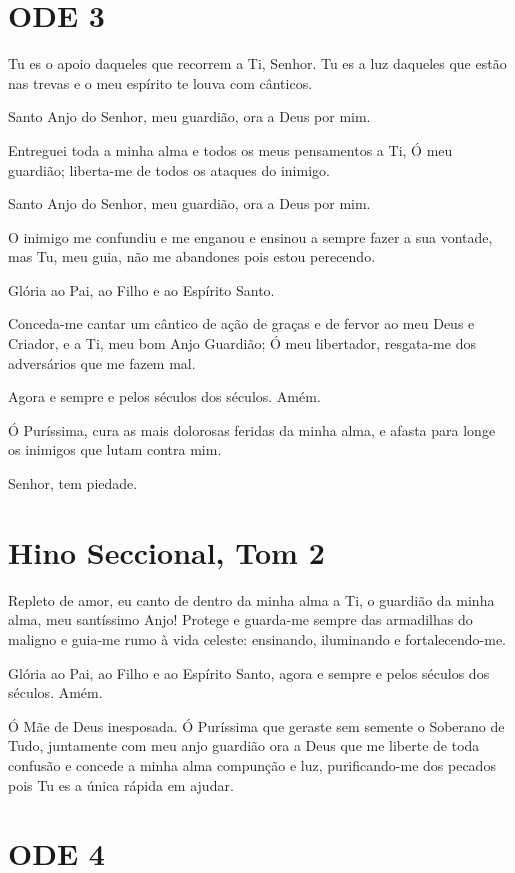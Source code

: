 \documentclass{subfiles}
\begin{document}
\section{ODE 3}

\eirmos{}Tu es o apoio daqueles que recorrem a Ti, Senhor. Tu es a luz daqueles
que estão nas trevas e o meu espírito te louva com cânticos.

Santo Anjo do Senhor, meu guardião, ora a Deus por mim.

Entreguei toda a minha alma e todos os meus pensamentos a Ti, Ó
meu guardião; liberta-me de todos os ataques do inimigo.

Santo Anjo do Senhor, meu guardião, ora a Deus por mim.

O inimigo me confundiu e me enganou e ensinou a sempre fazer a sua
vontade, mas Tu, meu guia, não me abandones pois estou perecendo.

Glória ao Pai, ao Filho e ao Espírito Santo.

Conceda-me cantar um cântico de ação de graças e de fervor ao meu
Deus e Criador, e a Ti, meu bom Anjo Guardião; Ó meu libertador, resgata-me
dos adversários que me fazem mal.

Agora e sempre e pelos séculos dos séculos. Amém.

Ó Puríssima, cura as mais dolorosas feridas da minha alma, e afasta
para longe os inimigos que lutam contra mim.

Senhor, tem piedade. 

\section{Hino Seccional, Tom 2}

Repleto de amor, eu canto de dentro da minha alma a Ti, o guardião da minha
alma, meu santíssimo Anjo! Protege e guarda-me sempre das armadilhas do maligno
e guia-me rumo à vida celeste: ensinando, iluminando e fortalecendo-me.

Glória ao Pai, ao Filho e ao Espírito Santo, agora e sempre e pelos séculos dos
séculos. Amém.

\theotokion{}Ó Mãe de Deus inesposada. Ó Puríssima que geraste sem
semente o Soberano de Tudo, juntamente com meu anjo guardião ora a Deus
que me liberte de toda confusão e concede a minha alma compunção e luz,
purificando-me dos pecados pois Tu es a única rápida em ajudar.

\section{ODE 4}
\end{document}
